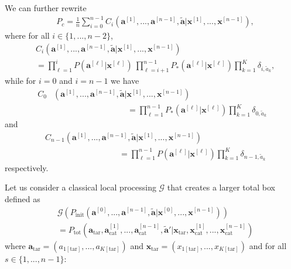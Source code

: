 \documentclass[pra,aps,reprint,superscriptaddress]{revtex4-2}
\theoremstyle{theorem}
\begin{document}
We can further rewrite 
\begin{align}
&P_c=\frac1n\sum_{i=0}^{n-1}C_i\left( \mathbf{a}^{[1]},...,\mathbf{a}^{[n-1]},\mathbf{\tilde a} \big| \mathbf{x}^{[1]},..., \mathbf{x}^{[n-1]}\right),  
\end{align}
where for all $i\in\{1,...,n-2\}$,
\begin{align}\nonumber
&C_i\left( \mathbf{a}^{[1]},...,\mathbf{a}^{[n-1]},\mathbf{\tilde a} \big| \mathbf{x}^{[1]},..., \mathbf{x}^{[n-1]}\right)\\&=\prod_{\ell=1}^{i}P\left(\mathbf{a}^{[\ell]}|\mathbf{x}^{[\ell]}\right)\ \prod_{\ell=i+1}^{n-1} P_*\left(\mathbf{a}^{[\ell]}|\mathbf{x}^{[\ell]}\right)\prod_{k=1}^K \delta_{i,\tilde a_k},
\end{align}
while for $i=0$ and $i=n-1$ we have 
\begin{align}\nonumber
C_0&\left( \mathbf{a}^{[1]},...,\mathbf{a}^{[n-1]},\mathbf{\tilde a} \big| \mathbf{x}^{[1]},..., \mathbf{x}^{[n-1]}\right)\\&\quad \quad \quad\quad \quad \quad\quad \quad \quad=\prod_{\ell=1}^{n-1}P_*\left(\mathbf{a}^{[\ell]}|\mathbf{x}^{[\ell]}\right)\prod_{k=1}^K \delta_{0,\tilde a_k}
\end{align}
and 
\begin{align}\nonumber
&C_{n-1}\left( \mathbf{a}^{[1]},...,\mathbf{a}^{[n-1]},\mathbf{\tilde a} \big| \mathbf{x}^{[1]},..., \mathbf{x}^{[n-1]}\right)\\&\quad \quad \quad\quad \quad \quad\quad \quad \quad=\prod_{\ell=1}^{n-1}P\left(\mathbf{a}^{[\ell]}|\mathbf{x}^{[\ell]}\right)\prod_{k=1}^K \delta_{n-1,\tilde a_k}
\end{align}
respectively. 



Let us consider a classical local processing $\mathcal{G}$ that creates a larger total box defined as
\begin{align}    \nonumber&\mathcal{G}\left(P_{\mathrm{init}}\left(\mathbf{a}^{[0]},...,\mathbf{a}^{[n-1]},\mathbf{\tilde a}\big| \mathbf{x}^{[0]},...,\mathbf{x}^{[n-1]}\right)\right)\\&
    =P_{\mathrm{tot}}\left(\mathbf{a}_{\mathrm{tar}}, \mathbf{a}^{[1]}_{\mathrm{cat}},...,\mathbf{a}^{[n-1]}_{\mathrm{cat}},\mathbf{\tilde a}' \big|\mathbf{x}_{\mathrm{tar}}, \mathbf{x}^{[1]}_{\mathrm{cat}},...,\mathbf{x}^{[n-1]}_{\mathrm{cat}} \right)
\end{align}
where $\mathbf{a}_{\mathrm{tar}} = (a_{1[\mathrm{tar}]},...,a_{K[\mathrm{tar}]})$ and $\mathbf{x}_{\mathrm{tar}} = (x_{1[\mathrm{tar}]},...,x_{K[\mathrm{tar}]})$ and for all $s\in\{1,...,n-1\}$:
\end{document}
